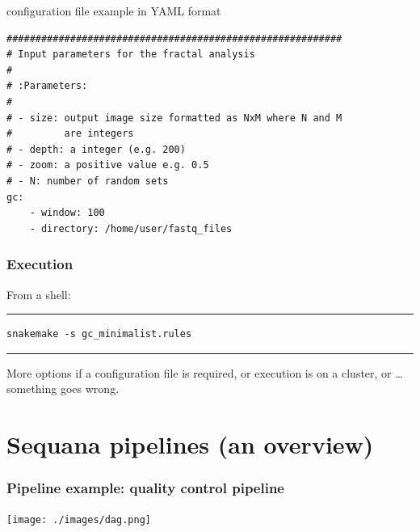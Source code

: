 \documentclass{beamer}
\begin{document}
\begin{frame}[fragile]
\begin{block}{configuration file example in YAML format}
 \begin{lstlisting}
##########################################################
# Input parameters for the fractal analysis
#
# :Parameters: 
#
# - size: output image size formatted as NxM where N and M 
#         are integers
# - depth: a integer (e.g. 200)
# - zoom: a positive value e.g. 0.5
# - N: number of random sets
gc:
    - window: 100
    - directory: /home/user/fastq_files
 \end{lstlisting}
\end{block}
\end{frame}


\begin{frame}[fragile]
\frametitle{Execution}

From a shell:
\rule{\textwidth}{1pt}


\begin{lstlisting}[basicstyle=\ttfamily\large]
snakemake -s gc_minimalist.rules
\end{lstlisting}

\rule{\textwidth}{1pt}

More options if a configuration file is required, or execution is on a cluster, 
or \dots something goes wrong.
\end{frame}

\section{Sequana pipelines (an overview)}


\begin{frame}
\frametitle{Pipeline example: quality control pipeline} 
\centering
\texttt{[image: ./images/dag.png]}
\end{frame}
\end{document}
